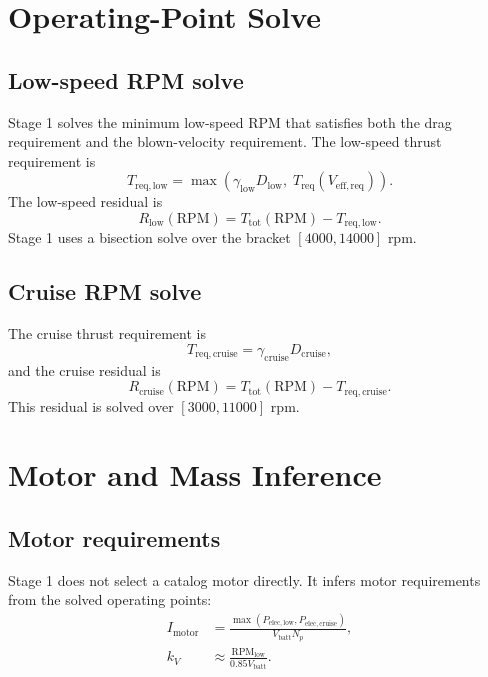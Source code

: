 \documentclass[11pt]{article}
\begin{document}
\section{Operating-Point Solve}

\subsection{Low-speed RPM solve}

Stage 1 solves the minimum low-speed RPM that satisfies both the drag requirement and the blown-velocity requirement. The low-speed thrust requirement is
\begin{equation}
T_{\mathrm{req,low}} =
\max\left(
\gamma_{\mathrm{low}} D_{\mathrm{low}},\;
T_{\mathrm{req}}(V_{\mathrm{eff,req}})
\right).
\end{equation}
The low-speed residual is
\begin{equation}
R_{\mathrm{low}}(\mathrm{RPM}) =
T_{\mathrm{tot}}(\mathrm{RPM}) - T_{\mathrm{req,low}}.
\end{equation}
Stage 1 uses a bisection solve over the bracket \([4000,14000]\) rpm.

\subsection{Cruise RPM solve}

The cruise thrust requirement is
\begin{equation}
T_{\mathrm{req,cruise}} = \gamma_{\mathrm{cruise}} D_{\mathrm{cruise}},
\end{equation}
and the cruise residual is
\begin{equation}
R_{\mathrm{cruise}}(\mathrm{RPM}) =
T_{\mathrm{tot}}(\mathrm{RPM}) - T_{\mathrm{req,cruise}}.
\end{equation}
This residual is solved over \([3000,11000]\) rpm.

\section{Motor and Mass Inference}

\subsection{Motor requirements}

Stage 1 does not select a catalog motor directly. It infers motor requirements from the solved operating points:
\begin{align}
I_{\mathrm{motor}} &=
\frac{\max(P_{\mathrm{elec,low}}, P_{\mathrm{elec,cruise}})}
{V_{\mathrm{batt}} N_p}, \\
k_V &\approx \frac{\mathrm{RPM}_{\mathrm{low}}}{0.85 V_{\mathrm{batt}}}.
\end{align}
\end{document}
